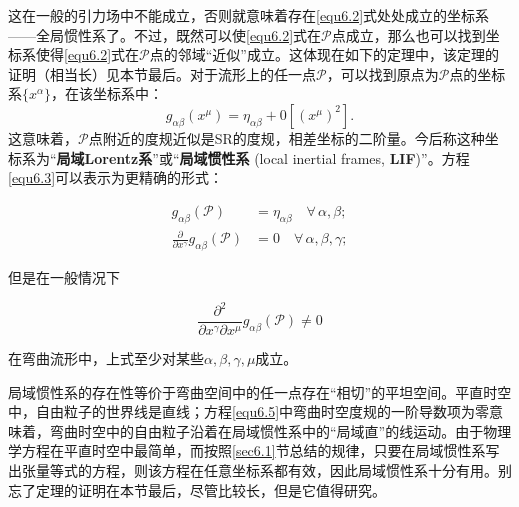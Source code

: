 这在一般的引力场中不能成立，否则就意味着存在\eqref{equ6.2}式处处成立的坐标系——全局惯性系了。不过，既然可以使\eqref{equ6.2}式在$\mathcal{P}$点成立，那么也可以找到坐标系使得\eqref{equ6.2}式在$\mathcal{P}$点的邻域“近似”成立。这体现在如下的定理中，该定理的证明（相当长）见本节最后。对于流形上的任一点$\mathcal{P}$，可以找到原点为$\mathcal{P}$点的坐标系$\{ x^\alpha \}$，在该坐标系中：
\begin{equation}
    g_{\alpha \beta} (x^\mu ) = \eta_{\alpha \beta} + 0 [(x^\mu)^2].
\label{equ6.3}
\end{equation}
这意味着，$\mathcal{P}$点附近的度规近似是SR的度规，相差坐标的二阶量。今后称这种坐标系为“\textbf{局域Lorentz系}”或“\textbf{局域惯性系} (local inertial frames, \textbf{LIF})”。方程\eqref{equ6.3}可以表示为更精确的形式：
\begin{shaded}
\begin{align}
    g_{\alpha \beta} (\mathcal{P}) &= \eta_{\alpha \beta} \quad \forall\, \alpha, \beta; \label{equ6.4} \\
    \frac{\partial}{\partial x^\gamma} g_{\alpha \beta} (\mathcal{P}) &= 0 \quad \forall\, \alpha, \beta, \gamma; \label{equ6.5}
\end{align}
\end{shaded}
但是在一般情况下
\begin{shaded}
\begin{equation*}
    \frac{\partial^2}{\partial x^\gamma \partial x^\mu} g_{\alpha \beta} (\mathcal{P}) \neq 0
\end{equation*}
\end{shaded}
在弯曲流形中，上式至少对某些$\alpha, \beta, \gamma, \mu$成立。

局域惯性系的存在性等价于弯曲空间中的任一点存在“相切”的平坦空间。平直时空中，自由粒子的世界线是直线；方程\eqref{equ6.5}中弯曲时空度规的一阶导数项为零意味着，弯曲时空中的自由粒子沿着在局域惯性系中的“局域直”的线运动。由于物理学方程在平直时空中最简单，而按照\ref{sec6.1}节总结的规律，只要在局域惯性系写出张量等式的方程，则该方程在任意坐标系都有效，因此局域惯性系十分有用。别忘了定理的证明在本节最后，尽管比较长，但是它值得研究。

